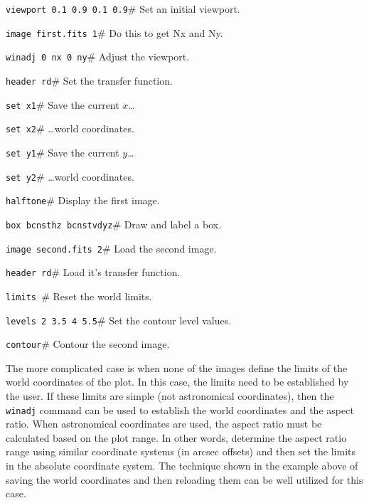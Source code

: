 \begin{wiplist}%
  \item {\tt viewport 0.1 0.9 0.1 0.9}\hfill \# Set an initial viewport.
  \item {\tt image first.fits 1}\hfill \# Do this to get Nx and Ny.
  \item {\tt winadj 0 nx 0 ny}\hfill \# Adjust the viewport.
  \item {\tt header rd}\hfill \# Set the transfer function.
  \item {\tt set  x1}\hfill \# Save the current $x$\dots
  \item {\tt set  x2}\hfill \# \dots world coordinates.
  \item {\tt set  y1}\hfill \# Save the current $y$\dots
  \item {\tt set  y2}\hfill \# \dots world coordinates.
  \item {\tt halftone}\hfill \# Display the first image.
  \item {\tt box bcnsthz bcnstvdyz}\hfill \# Draw and label a box.
  \item {\tt image second.fits 2}\hfill \# Load the second image.
  \item {\tt header rd}\hfill \# Load it's transfer function.
  \item {\tt limits    }\hfill \# Reset the world limits.
  \item {\tt levels 2 3.5 4 5.5}\hfill \# Set the contour level values.
  \item {\tt contour}\hfill \# Contour the second image.
\end{wiplist}

The more complicated case is when none of the images define the limits of the
world
coordinates of the plot.
In this case, the limits need to be established by the user.
If these limits are simple (\ie not astronomical coordinates),
then the {\tt winadj} command can be used to establish the world coordinates
and the aspect ratio.
When astronomical coordinates are used, the aspect ratio must be
calculated based on the plot range.
In other words, determine the aspect ratio range using similar
coordinate systems (\eg in arcsec offsets) and then set the limits in
the absolute coordinate system.
The technique shown in the example above of saving the world coordinates
and then reloading them can be well utilized for this case.

